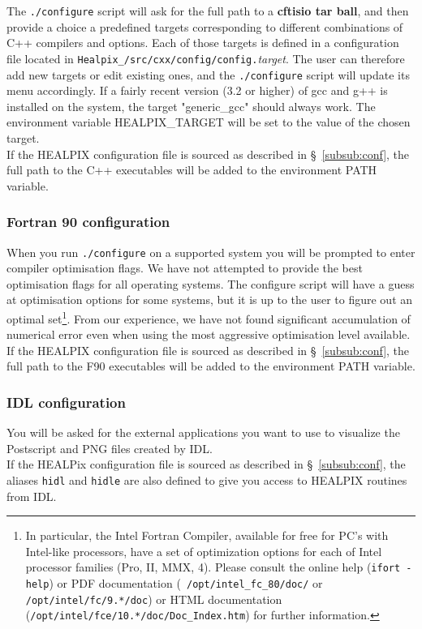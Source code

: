 \documentclass[12pt,twoside]{article}
\begin{document}
The {\tt ./configure} script will 
ask for the full path to a {\bf cftisio tar ball}, and then provide a choice a
predefined targets corresponding to different combinations of C++ compilers and
options. Each of those targets is defined in a configuration file located in
{\tt Healpix\_\hpxversion/src/cxx/config/config.}{\em target}.
The user can therefore add new targets or edit existing ones, and the
{\tt ./configure} script will update its menu accordingly.
If a fairly recent version
(3.2 or higher) of gcc and g++ is installed on the system, the target
"generic\_gcc" should always work. The environment variable HEALPIX\_TARGET will
be set to the value of the chosen target.
\\
If the HEALPIX configuration file is sourced as described in \S~\ref{subsub:conf}, the full path to the C++
executables will be added to the environment PATH variable.


\subsubsection{Fortran 90 configuration}
When you run {\tt ./configure} on a supported system 
you will be prompted to enter compiler optimisation flags.
We have not attempted to provide the best optimisation flags for all
operating systems. The configure
script will have a guess at optimisation options for some systems, but it
is up to the user to figure out an optimal set\footnote{In particular, the Intel Fortran
Compiler, available for free for PC's with Intel-like processors, have a set of
optimization options for each of Intel processor families (Pro, II, MMX, 4). Please consult
the online help ({\tt ifort -help}) or PDF documentation ({\tt
/opt/intel\_fc\_80/doc/} or {\tt /opt/intel/fc/9.*/doc}) or HTML documentation
({\tt /opt/intel/fce/10.*/doc/Doc\_Index.htm}) for further information.}. From our experience,
we have not found significant accumulation of numerical error even
when using the most aggressive optimisation level available. \\
If the HEALPIX configuration file is sourced as described in \S~\ref{subsub:conf}, the full path to the F90
executables will be added to the environment PATH variable.

\subsubsection{IDL configuration}
You will be asked for the external applications you want to use to visualize the
Postscript and PNG files created by IDL. \\
If the HEALPix configuration file is
sourced as described in \S~\ref{subsub:conf}, the aliases {\tt hidl} and {\tt hidle}
are also defined to give you access to HEALPIX routines from IDL.
\end{document}
